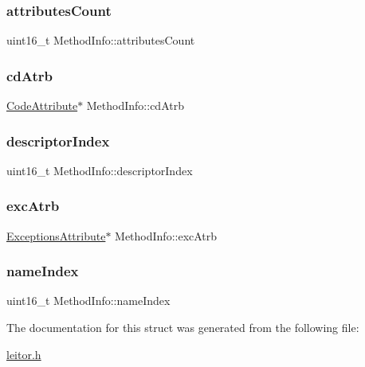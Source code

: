 \subsubsection{\texorpdfstring{attributes\+Count}{attributesCount}}
{\footnotesize\ttfamily uint16\+\_\+t Method\+Info\+::attributes\+Count}

\mbox{\label{structMethodInfo_a6e5b903a4ae8fdf418b3955b93ded1c4}} 
\subsubsection{\texorpdfstring{cd\+Atrb}{cdAtrb}}
{\footnotesize\ttfamily \hyperlink{structCodeAttribute}{Code\+Attribute}$\ast$ Method\+Info\+::cd\+Atrb}

\mbox{\label{structMethodInfo_a4be51921e4147d189cc314b9b3a75161}} 
\subsubsection{\texorpdfstring{descriptor\+Index}{descriptorIndex}}
{\footnotesize\ttfamily uint16\+\_\+t Method\+Info\+::descriptor\+Index}

\mbox{\label{structMethodInfo_ae09864e7cbb1f6423209b89a1ecb70a8}} 
\subsubsection{\texorpdfstring{exc\+Atrb}{excAtrb}}
{\footnotesize\ttfamily \hyperlink{structExceptionsAttribute}{Exceptions\+Attribute}$\ast$ Method\+Info\+::exc\+Atrb}

\mbox{\label{structMethodInfo_a946349e82f47156b63c58e57061d6891}} 
\subsubsection{\texorpdfstring{name\+Index}{nameIndex}}
{\footnotesize\ttfamily uint16\+\_\+t Method\+Info\+::name\+Index}



The documentation for this struct was generated from the following file\+:\begin{DoxyCompactItemize}
\item 
\hyperlink{leitor_8h}{leitor.\+h}\end{DoxyCompactItemize}
